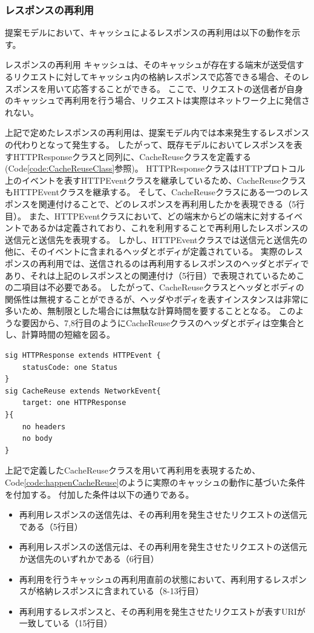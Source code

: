 \documentclass[12pt,a4paper]{jbook}
\begin{document}
\subsubsection{レスポンスの再利用}
提案モデルにおいて、キャッシュによるレスポンスの再利用は以下の動作を示す。

\begin{itembox}[l]{レスポンスの再利用}
キャッシュは、そのキャッシュが存在する端末が送受信するリクエストに対してキャッシュ内の格納レスポンスで応答できる場合、そのレスポンスを用いて応答することができる。
ここで、リクエストの送信者が自身のキャッシュで再利用を行う場合、リクエストは実際はネットワーク上に発信されない。
\end{itembox}

上記で定めたレスポンスの再利用は、提案モデル内では本来発生するレスポンスの代わりとなって発生する。
したがって、既存モデルにおいてレスポンスを表すHTTPResponseクラスと同列に、CacheReuseクラスを定義する(Code\ref{code:CacheReuseClass}参照)。
HTTPResponseクラスはHTTPプロトコル上のイベントを表すHTTPEventクラスを継承しているため、CacheReuseクラスもHTTPEventクラスを継承する。
そして、CacheReuseクラスにある一つのレスポンスを関連付けることで、どのレスポンスを再利用したかを表現できる（5行目）。
また、HTTPEventクラスにおいて、どの端末からどの端末に対するイベントであるかは定義されており、これを利用することで再利用したレスポンスの送信元と送信先を表現する。
しかし、HTTPEventクラスでは送信元と送信先の他に、そのイベントに含まれるヘッダとボディが定義されている。
実際のレスポンスの再利用では、送信されるのは再利用するレスポンスのヘッダとボディであり、それは上記のレスポンスとの関連付け（5行目）で表現されているためこの二項目は不必要である。
\color{red}
したがって、CacheReuseクラスとヘッダとボディの関係性は無視することができるが、ヘッダやボディを表すインスタンスは非常に多いため、無制限とした場合には無駄な計算時間を要することとなる。
このような要因から、7,8行目のようにCacheReuseクラスのヘッダとボディは空集合とし、計算時間の短縮を図る。
\color{black}

\begin{lstlisting}[caption=CacheReuseクラス, label=code:CacheReuseClass]
sig HTTPResponse extends HTTPEvent {
	statusCode: one Status
}
sig CacheReuse extends NetworkEvent{
	target: one HTTPResponse
}{
	no headers
	no body
}
\end{lstlisting}

上記で定義したCacheReuseクラスを用いて再利用を表現するため、Code\ref{code:happenCacheReuse}のように実際のキャッシュの動作に基づいた条件を付加する。
付加した条件は以下の通りである。
\begin{itemize}
\item 再利用レスポンスの送信先は、その再利用を発生させたリクエストの送信元である（5行目）
\item 再利用レスポンスの送信元は、その再利用を発生させたリクエストの送信元か送信先のいずれかである（6行目）
\item 再利用を行うキャッシュの再利用直前の状態において、再利用するレスポンスが格納レスポンスに含まれている（8-13行目）
\item 再利用するレスポンスと、その再利用を発生させたリクエストが表すURIが一致している（15行目）
\end{itemize}
\end{document}
